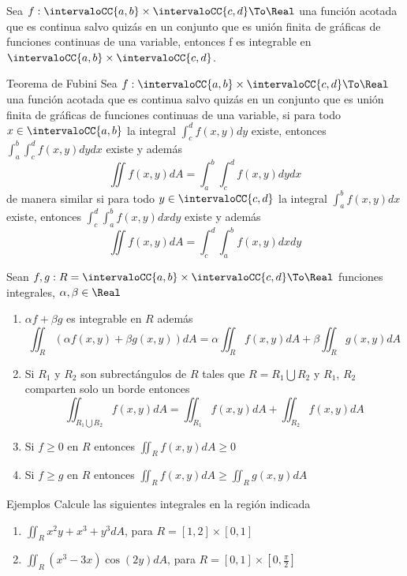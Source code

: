 \begin{frame}
\begin{thm}
  Sea $f:\intervaloCC{a,b}\times \intervaloCC{c,d}\To\Real$ una función acotada que es continua salvo quizás en un conjunto que es unión finita de gráficas de funciones continuas de una variable, entonces f es integrable en $\intervaloCC{a,b}\times \intervaloCC{c,d}$.
\end{thm}
\end{frame}

\begin{frame}
\begin{block}{Teorema de Fubini}
  Sea $f:\intervaloCC{a,b}\times \intervaloCC{c,d}\To\Real$ una función acotada que es continua salvo quizás en un conjunto que es unión finita de gráficas de funciones continuas de una variable, si para todo $x\in\intervaloCC{a,b}$ la integral $\int_c^d f(x,y) dy$ existe, entonces $\int_a^b\int_c^d f(x,y) dydx$ existe y además
  $$\iint f(x,y) dA=\int_a^b\int_c^d f(x,y) dydx$$
  de manera similar si para todo $y\in\intervaloCC{c,d}$ la integral $\int_a^b f(x,y) dx$ existe, entonces $\int_c^d\int_a^b f(x,y) dxdy$ existe y además
  $$\iint f(x,y) dA=\int_c^d\int_a^b f(x,y) dxdy$$
\end{block}
\end{frame}

\begin{frame}
  \begin{prop}
  Sean $f,g:R=\intervaloCC{a,b}\times\intervaloCC{c,d}\To\Real$ funciones integrales, $\alpha,\beta\in\Real$
  \begin{enumerate}
    \item $\alpha f+\beta g$ es integrable en $R$ además
    $$\iint_R(\alpha f(x,y)+\beta g(x,y))dA=\alpha\iint_R f (x,y)dA+\beta\iint_R g(x,y)dA$$
    \item Si $R_1$ y $R_2$ son subrectángulos de $R$ tales que $R=R_1\bigcup R_2$ y $R_1$, $R_2$ comparten solo un borde entonces 
    $$\iint_{R_1\bigcup R_2} f(x,y)dA=\iint_{R_1} f(x,y)dA+\iint_{R_2} f(x,y)dA$$
    \item Si $f\geq 0$ en $R$ entonces $\iint_R f(x,y)dA\geq 0$
    \item Si $f\geq g$ en $R$ entonces $\iint_R f(x,y)dA\geq\iint_R g(x,y)dA$
  \end{enumerate}
  \end{prop}
\end{frame}

\begin{frame}{Ejemplos}
  Calcule las siguientes integrales en la región indicada
  \begin{enumerate}[<+->]
    \item $\displaystyle\iint_{R} x^2y+x^3+y^3 dA$, para $R=[1,2]\times[0,1]$
    \item $\displaystyle\iint_{R} (x^3-3x)\cos(2y) dA$, para $R=[0,1]\times[0,\frac{\pi}{2}] $
  \end{enumerate}
\end{frame}  

